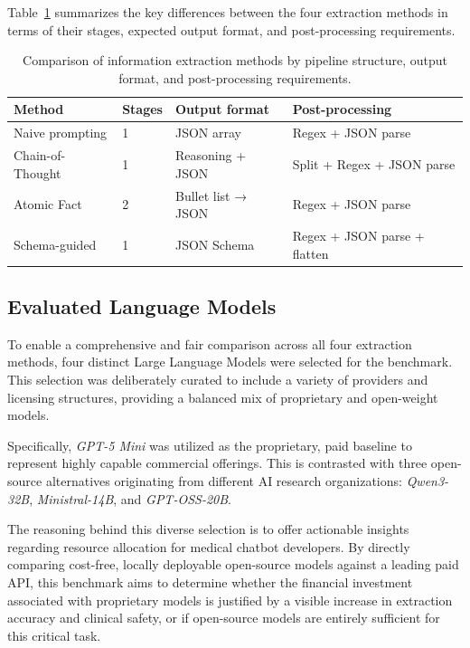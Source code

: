 Table~\ref{tab:ie_methods} summarizes the key differences between 
the four extraction methods in terms of their stages, expected output 
format, and post-processing requirements.

\begin{table}[h]
\centering
\caption{Comparison of information extraction methods by pipeline 
         structure, output format, and post-processing requirements.}
\label{tab:ie_methods}
\begin{tabular}{llll}
\toprule
\textbf{Method} & \textbf{Stages} & \textbf{Output format} & \textbf{Post-processing} \\
\midrule
Naive prompting  & 1               & JSON array             & Regex + JSON parse \\
Chain-of-Thought & 1               & Reasoning + JSON       & Split + Regex + JSON parse \\
Atomic Fact      & 2               & Bullet list → JSON     & Regex + JSON parse \\
Schema-guided    & 1               & JSON Schema            & Regex + JSON parse + flatten \\
\bottomrule
\end{tabular}
\end{table}

\subsection{Evaluated Language Models}

To enable a comprehensive and fair comparison across all four extraction methods, four distinct Large Language Models were selected for the benchmark. 
This selection was deliberately curated to include a variety of providers and licensing structures, providing a balanced mix of proprietary and open-weight models.

Specifically, \textit{GPT-5 Mini} was utilized as the proprietary, paid baseline to represent highly capable commercial offerings. 
This is contrasted with three open-source alternatives originating from different AI research organizations: \textit{Qwen3-32B}, \textit{Ministral-14B}, and \textit{GPT-OSS-20B}.

The reasoning behind this diverse selection is to offer actionable insights regarding resource allocation for medical chatbot developers. 
By directly comparing cost-free, locally deployable open-source models against a leading paid API, this benchmark aims to determine whether the financial investment associated with proprietary models is justified by a visible increase in extraction accuracy and clinical safety, or if open-source models are entirely sufficient for this critical task.

